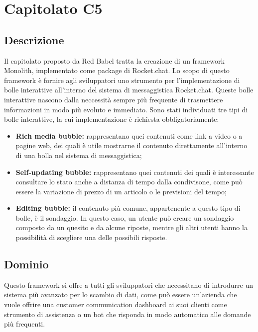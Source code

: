\newpage
\section{Capitolato C5}

\subsection{Descrizione}

Il capitolato proposto da Red Babel tratta la creazione di un framework Monolith, implementato come package di Rocket.chat. Lo scopo di questo
framework è fornire agli sviluppatori uno strumento per l'implementazione di bolle interattive all'interno del sistema di messaggistica Rocket.chat.
Queste bolle interattive nascono dalla neccessità sempre più frequente di trasmettere informazioni in modo più evoluto e immediato.
Sono stati individuati tre tipi di bolle interattive, la cui implementazione è richiesta obbligatoriamente:

\begin{itemize}
	\item \textbf{Rich media bubble:} rappresentano quei contenuti come link a video
	o a pagine web, dei quali è utile mostrarne il contenuto direttamente all'interno di una bolla nel sistema di messaggistica;
	\item \textbf{Self-updating bubble:} rappresentano quei contenuti dei quali è interessante
	consultare lo stato anche a distanza di tempo dalla condivisone, come
	può essere la variazione di prezzo di un articolo o le previsioni del tempo;
	\item \textbf{Editing bubble:} il contenuto più comune, appartenente a questo tipo di bolle, è il sondaggio. In questo caso, un utente può creare un sondaggio
	composto da un quesito e da alcune riposte, mentre gli altri utenti hanno la possibilità di scegliere una delle possibili risposte.
\end{itemize}


\subsection{Dominio}

Questo framework si offre a tutti gli sviluppatori che necessitano di introdurre un sistema più avanzato per lo scambio di dati, come può essere un'azienda che vuole offrire una customer communication dashboard ai suoi clienti come strumento di assistenza o un bot che risponda in modo automatico alle domande più frequenti. 

